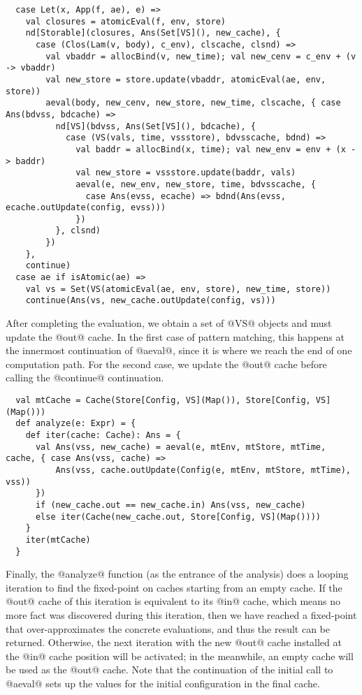 \documentclass[acmsmall, review]{acmart}\settopmatter{}
\begin{document}
\begin{lstlisting}
  case Let(x, App(f, ae), e) =>
    val closures = atomicEval(f, env, store)
    nd[Storable](closures, Ans(Set[VS](), new_cache), {
      case (Clos(Lam(v, body), c_env), clscache, clsnd) =>
        val vbaddr = allocBind(v, new_time); val new_cenv = c_env + (v -> vbaddr)
        val new_store = store.update(vbaddr, atomicEval(ae, env, store))
        aeval(body, new_cenv, new_store, new_time, clscache, { case Ans(bdvss, bdcache) =>
          nd[VS](bdvss, Ans(Set[VS](), bdcache), {
            case (VS(vals, time, vssstore), bdvsscache, bdnd) =>
              val baddr = allocBind(x, time); val new_env = env + (x -> baddr)
              val new_store = vssstore.update(baddr, vals)
              aeval(e, new_env, new_store, time, bdvsscache, {
                case Ans(evss, ecache) => bdnd(Ans(evss, ecache.outUpdate(config, evss)))
              })
          }, clsnd)
        })
    },
    continue)
  case ae if isAtomic(ae) =>
    val vs = Set(VS(atomicEval(ae, env, store), new_time, store))
    continue(Ans(vs, new_cache.outUpdate(config, vs)))
\end{lstlisting}

After completing the evaluation, we obtain a set of @VS@ objects and must update the @out@ cache.
In the first case of pattern matching, this happens at the innermost continuation of @aeval@,
since it is where we reach the end of one computation path.
For the second case, we update the @out@ cache before calling the @continue@ continuation.

\begin{lstlisting}
  val mtCache = Cache(Store[Config, VS](Map()), Store[Config, VS](Map()))
  def analyze(e: Expr) = {
    def iter(cache: Cache): Ans = {
      val Ans(vss, new_cache) = aeval(e, mtEnv, mtStore, mtTime, cache, { case Ans(vss, cache) => 
          Ans(vss, cache.outUpdate(Config(e, mtEnv, mtStore, mtTime), vss))
      })
      if (new_cache.out == new_cache.in) Ans(vss, new_cache)
      else iter(Cache(new_cache.out, Store[Config, VS](Map())))
    }
    iter(mtCache)
  }
\end{lstlisting}

Finally, the @analyze@ function (as the entrance of the analysis) does a looping iteration
to find the fixed-point on caches starting from an empty cache.
If the @out@ cache of this iteration is equivalent to its @in@ cache, which means no more 
fact was discovered during this iteration, then we have reached a fixed-point that 
over-approximates the concrete evaluations, and thus the result can be returned.
Otherwise, the next iteration with the new @out@ cache installed at the @in@ cache
position will be activated; in the meanwhile, an empty cache will be used as the @out@
cache. Note that the continuation of the initial call to @aeval@ sets up the values for
the initial configuration in the final cache.
\end{document}
